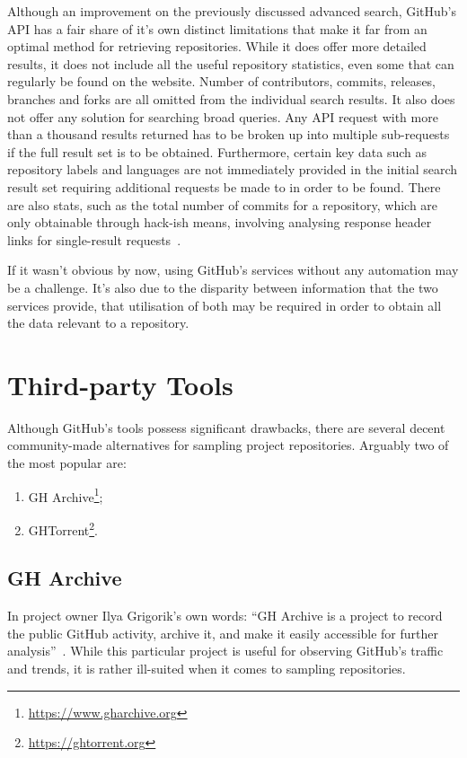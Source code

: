 Although an improvement on the previously discussed advanced search, GitHub's API has a fair share of it's own distinct limitations that make it far from an optimal method for retrieving repositories.
While it does offer more detailed results, it does not include all the useful repository statistics, even some that can regularly be found on the website.
Number of contributors, commits, releases, branches and forks are all omitted from the individual search results.
It also does not offer any solution for searching broad queries.
Any API request with more than a thousand results returned has to be broken up into multiple sub-requests if the full result set is to be obtained.
Furthermore, certain key data such as repository labels and languages are not immediately provided in the initial search result set requiring additional requests be made to in order to be found.
There are also stats, such as the total number of commits for a repository, which are only obtainable through hack-ish means, involving analysing response header links for single-result requests~\cite{GIST1}.

If it wasn't obvious by now, using GitHub's services without any automation may be a challenge.
It's also due to the disparity between information that the two services provide, that utilisation of both may be required in order to obtain all the data relevant to a repository.

\section{Third-party Tools}

Although GitHub's tools possess significant drawbacks, there are several decent community-made alternatives for sampling project repositories.
Arguably two of the most popular are:
\begin{enumerate}
    \item GH Archive\footnote{\url{https://www.gharchive.org}};
    \item GHTorrent\footnote{\url{https://ghtorrent.org}}.
\end{enumerate}

\subsection{GH Archive}

In project owner Ilya Grigorik's own words: ``GH Archive is a project to record the public GitHub activity, archive it, and make it easily accessible for further analysis''~\cite{GHA}.
While this particular project is useful for observing GitHub's traffic and trends, it is rather ill-suited when it comes to sampling repositories.

